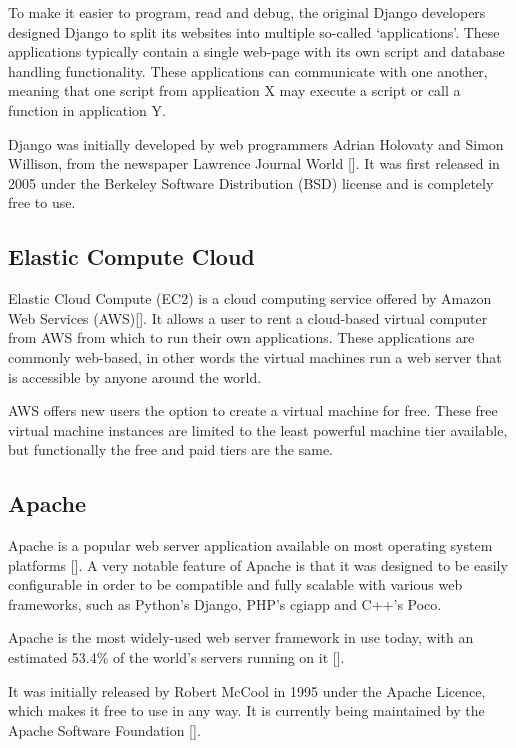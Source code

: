 To make it easier to program, read and debug, the original Django developers
designed Django to split its websites into multiple so-called `applications'.
These applications typically contain a single web-page with its own script and
database handling functionality. These applications can communicate with one
another, meaning that one script from application X may execute a script or
call a function in application Y.

Django was initially developed by web programmers Adrian Holovaty and Simon Willison, from the
newspaper Lawrence Journal World [\cite{website:django-exist}]. It was first released in 2005
under the Berkeley Software Distribution (BSD) license and is completely free to use.

\subsection{Elastic Compute Cloud}
\label{sec:ec2}

Elastic Cloud Compute (EC2) is a cloud computing service offered by Amazon Web
Services (AWS)[\cite{website:aws}]. It allows a user to rent a cloud-based
virtual computer from AWS from which to run their own applications.
These applications are commonly web-based, in other words the virtual machines run a
web server that is accessible by anyone around the world.  

AWS offers new users the option to create a virtual machine for free. These free
virtual machine instances are limited to the least powerful machine tier available, but
functionally the free and paid tiers are the same.

\subsection{Apache}
\label{sec:apache}

Apache is a popular web server application available on most operating system
platforms [\cite{website:apache-platforms}].
A very notable feature of Apache is that it was designed to be easily
configurable in order to be compatible and fully scalable with various web
frameworks, such as Python's Django, PHP's cgiapp and C++'s Poco.

Apache is the most widely-used web server framework in use today, with an
estimated 53.4\% of the world's servers running on it [\cite{website:apache-usage}].

It was initially released by Robert McCool in 1995 under the Apache Licence, which makes it
free to use in any way. It is currently being maintained by the Apache Software
Foundation [\cite{website:apache}].

